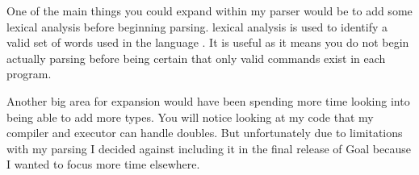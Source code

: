 One of the main things you could expand within my parser would be to add some lexical analysis before beginning parsing. lexical analysis is used to identify a valid set of words used in the language \cite[p.~13]{CompDes2005}. It is useful as it means you do not begin actually parsing before being certain that only valid commands exist in each program.

Another big area for expansion would have been spending more time looking into being able to add more types. You will notice looking at my code that my compiler and executor can handle doubles. But unfortunately due to limitations with my parsing I decided against including it in the final release of Goal because I wanted to focus more time elsewhere.   
 